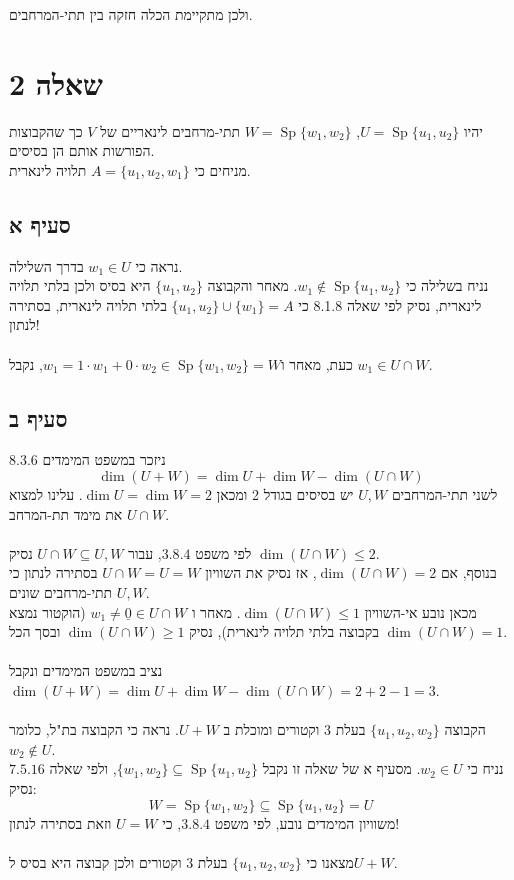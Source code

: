 \documentclass{article}
\DeclareMathOperator\Sp{Sp}
\def\zerovec{\underline{0}}
\begin{document}
ולכן מתקיימת הכלה חזקה בין תתי-המרחבים.

\pagebreak

\section*{שאלה 2}

יהיו $U=\Sp\{u_1, u_2\}$, $W=\Sp\{ w_1, w_2\}$ תתי-מרחבים לינאריים של $V$ כך שהקבוצות הפורשות אותם הן בסיסים.\\
מניחים כי $A=\{ u_1, u_2, w_1 \}$ תלויה לינארית.

\subsection*{סעיף א}

נראה כי $w_1\in U$ בדרך השלילה. \\
נניח בשלילה כי $w_1\notin \Sp\{u_1, u_2\}$.
מאחר והקבוצה $\{ u_1, u_2 \}$ היא בסיס ולכן בלתי תלויה לינארית,
נסיק לפי שאלה 8.1.8 כי $\{ u_1, u_2 \}\cup \{ w_1 \}=A$ בלתי תלויה לינארית, בסתירה לנתון!
\\\\
כעת, מאחר ו$w_1=1\cdot w_1+0\cdot w_2\in \Sp\{ w_1, w_2\}=W$, נקבל $w_1\in U\cap W$.

\subsection*{סעיף ב}

ניזכר במשפט המימדים 8.3.6
\[
    \dim(U+W)=\dim U+\dim W-\dim(U\cap W)
\]
לשני תתי-המרחבים $U,W$ יש בסיסים בגודל 2 ומכאן $\dim U=\dim W=2$. עלינו למצוא את מימד תת-המרחב $U\cap W$.
\\\\
לפי משפט $3.8.4$, עבור $U\cap W\subseteq U, W$ נסיק $\dim(U\cap W)\leq 2$. \\
בנוסף, אם $\dim(U\cap W)=2$, אז נסיק את השוויון $U\cap W=U=W$ בסתירה לנתון כי $U,W$ תתי-מרחבים שונים. \\
מכאן נובע אי-השוויון $\dim(U\cap W)\leq 1$. מאחר ו $w_1\ne \zerovec\in U\cap W$ (הוקטור נמצא בקבוצה בלתי תלויה לינארית),
נסיק $\dim(U\cap W)\geq 1$ ובסך הכל $\dim(U\cap W)=1$.
\\\\
נציב במשפט המימדים ונקבל $\dim(U+W)=\dim U + \dim W - \dim(U\cap W)=2+2-1=3$.
\\\\
הקבוצה $\{u_1, u_2, w_2\}$ בעלת 3 וקטורים ומוכלת ב $U+W$. נראה כי הקבוצה בת"ל, כלומר $w_2\notin U$. \\
נניח כי $w_2\in U$. מסעיף א של שאלה זו נקבל $\{ w_1, w_2\}\subseteq \Sp\{u_1, u_2\}$, ולפי שאלה $7.5.16$ נסיק:
\[
    W=\Sp\{ w_1, w_2\}\subseteq \Sp\{u_1, u_2\}=U
\]
משוויון המימדים נובע, לפי משפט $3.8.4$, כי $U=W$ וזאת בסתירה לנתון!\\\\

מצאנו כי $\{u_1, u_2, w_2\}$ בעלת 3 וקטורים ולכן קבוצה היא בסיס ל$U+W$.
\end{document}

